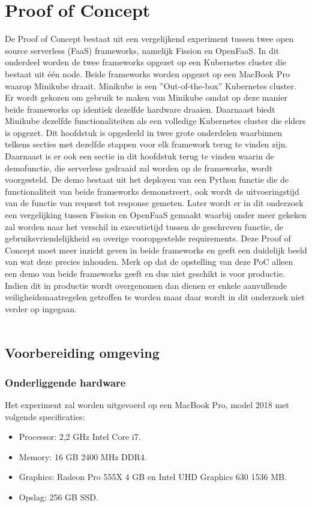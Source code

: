\chapter{Proof of Concept}
\label{ch:proof-of-concept}
De Proof of Concept bestaat uit een vergelijkend experiment tussen twee open source serverless (FaaS) frameworks, namelijk Fission en OpenFaaS. In dit onderdeel worden de twee frameworks opgezet op een Kubernetes cluster die bestaat uit één node. Beide frameworks worden opgezet op een MacBook Pro waarop Minikube draait. Minikube is een ''Out-of-the-box'' Kubernetes cluster. Er wordt gekozen om gebruik te maken van Minikube omdat op deze manier beide frameworks op identiek dezelfde hardware draaien. Daarnaast biedt Minikube dezelfde functionaliteiten als een volledige Kubernetes cluster die elders is opgezet. Dit hoofdstuk is opgedeeld in twee grote onderdelen waarbinnen telkens secties met dezelfde stappen voor elk framework terug te vinden zijn. Daarnaast is er ook een sectie in dit hoofdstuk terug te vinden waarin de demofunctie, die serverless gedraaid zal worden op de frameworks, wordt voorgesteld. De demo bestaat uit het deployen van een Python functie die de functionaliteit van beide frameworks demonstreert, ook wordt de uitvoeringstijd van de functie van request tot response gemeten. Later wordt er in dit onderzoek een vergelijking tussen Fission en OpenFaaS gemaakt waarbij onder meer gekeken zal worden naar het verschil in executietijd tussen de geschreven functie, de gebruiksvriendelijkheid en overige vooropgestelde requirements. Deze Proof of Concept moet meer inzicht geven in beide frameworks en geeft een duidelijk beeld van wat deze precies inhouden. Merk op dat de opstelling van deze PoC alleen een demo van beide frameworks geeft en dus niet geschikt is voor productie. Indien dit in productie wordt overgenomen dan dienen er enkele aanvullende veiligheidsmaatregelen getroffen te worden maar daar wordt in dit onderzoek niet verder op ingegaan.
\\\\
\section{Voorbereiding omgeving}
\label{sec:voorbereiding-omgeving}
\subsection{Onderliggende hardware}
\label{sec:specificaties}
Het experiment zal worden uitgevoerd op een MacBook Pro, model 2018 met volgende specificaties:
\begin{itemize}
    \item Processor: 2,2 GHz Intel Core i7.
    \item Memory: 16 GB 2400 MHz DDR4.
    \item Graphics: Radeon Pro 555X 4 GB en Intel UHD Graphics 630 1536 MB.
    \item Opslag: 256 GB SSD.
\end{itemize}

